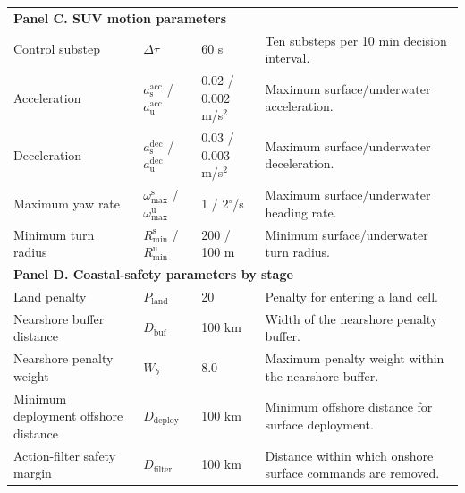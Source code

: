 \documentclass[a4paper,fleqn]{cas-dc}
\begin{document}
\begin{center}
{\begin{tabular}{@{}p{}p{}p{}p{}@{}}
\midrule
\multicolumn{4}{l}{\textbf{Panel C. SUV motion parameters}} \\
Control substep & $\Delta\tau$ & 60 s &
Ten substeps per 10 min decision interval. \\
Acceleration & $a_{\mathrm{s}}^{\mathrm{acc}}$ /
$a_{\mathrm{u}}^{\mathrm{acc}}$ & 0.02 / 0.002 m/s$^2$ &
Maximum surface/underwater acceleration. \\
Deceleration & $a_{\mathrm{s}}^{\mathrm{dec}}$ /
$a_{\mathrm{u}}^{\mathrm{dec}}$ & 0.03 / 0.003 m/s$^2$ &
Maximum surface/underwater deceleration. \\
Maximum yaw rate & $\omega_{\max}^{\mathrm{s}}$ /
$\omega_{\max}^{\mathrm{u}}$ & 1 / 2$^\circ$/s &
Maximum surface/underwater heading rate. \\
Minimum turn radius & $R_{\min}^{\mathrm{s}}$ /
$R_{\min}^{\mathrm{u}}$ & 200 / 100 m &
Minimum surface/underwater turn radius. \\

\midrule
\multicolumn{4}{l}{\textbf{Panel D. Coastal-safety parameters by stage}} \\
Land penalty & $P_{\mathrm{land}}$ & 20 &
Penalty for entering a land cell. \\
Nearshore buffer distance & $D_{\mathrm{buf}}$ & 100 km &
Width of the nearshore penalty buffer. \\
Nearshore penalty weight & $W_b$ & 8.0 &
Maximum penalty weight within the nearshore buffer. \\
Minimum deployment offshore distance & $D_{\mathrm{deploy}}$ & 100 km &
Minimum offshore distance for surface deployment. \\
Action-filter safety margin & $D_{\mathrm{filter}}$ & 100 km &
Distance within which onshore surface commands are removed. \\
\bottomrule
\end{tabular}}
\end{center}

\clearpage
\end{document}
